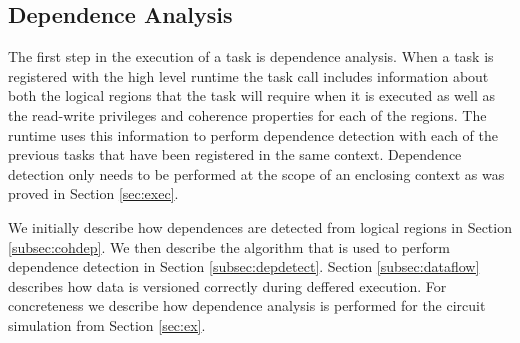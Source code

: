 \subsection{Dependence Analysis} 
\label{subsec:depanalysis}
The first step in the execution of a task is dependence analysis.  When
a task is registered with the high level runtime the task call includes
information about both the logical regions that the task will require
when it is executed as well as the read-write privileges and coherence properties
for each of the regions.  The runtime uses this information to perform
dependence detection with each of the previous tasks that have been registered
in the same context.  Dependence detection only needs to be performed at
the scope of an enclosing context as was proved in Section \ref{sec:exec}. 

We initially describe how dependences are detected from logical regions
in Section \ref{subsec:cohdep}.  We then describe the algorithm that
is used to perform dependence detection in Section \ref{subsec:depdetect}.
Section \ref{subsec:dataflow} describes how data is versioned correctly
during deffered execution.  For concreteness we describe how dependence
analysis is performed for the circuit simulation from Section \ref{sec:ex}.
